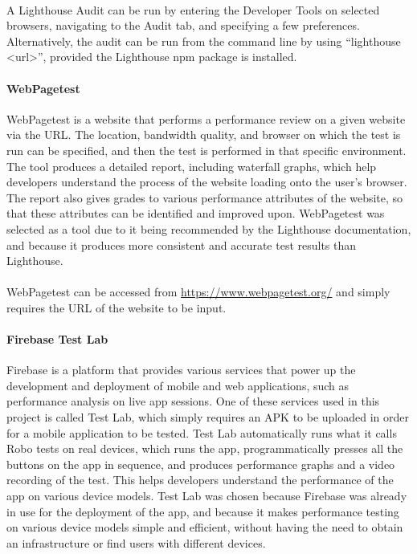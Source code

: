 \documentclass[a4paper, 11pt]{article}
\begin{document}
            \paragraph{}
            A Lighthouse Audit can be run by entering the Developer Tools on selected browsers, navigating to the Audit tab, and specifying a few preferences. Alternatively, the audit can be run from the command line by using “lighthouse <url>”, provided the Lighthouse npm package is installed.
            
            \paragraph{WebPagetest}
            WebPagetest is a website that performs a performance review on a given website via the URL. The location, bandwidth quality, and browser on which the test is run can be specified, and then the test is performed in that specific environment. The tool produces a detailed report, including waterfall graphs, which help developers understand the process of the website loading onto the user’s browser. The report also gives grades to various performance attributes of the website, so that these attributes can be identified and improved upon. WebPagetest was selected as a tool due to it being recommended by the Lighthouse documentation, and because it produces more consistent and accurate test results than Lighthouse.
            \paragraph{}
            WebPagetest can be accessed from \url{https://www.webpagetest.org/} and simply requires the URL of the website to be input.
            
            \paragraph{Firebase Test Lab}
            Firebase is a platform that provides various services that power up the development and deployment of mobile and web applications, such as performance analysis on live app sessions. One of these services used in this project is called Test Lab, which simply requires an APK to be uploaded in order for a mobile application to be tested. Test Lab automatically runs what it calls Robo tests on real devices, which runs the app, programmatically presses all the buttons on the app in sequence, and produces performance graphs and a video recording of the test. This helps developers understand the performance of the app on various device models. Test Lab was chosen because Firebase was already in use for the deployment of the app, and because it makes performance testing on various device models simple and efficient, without having the need to obtain an infrastructure or find users with different devices.
\end{document}
